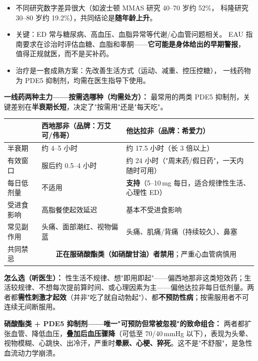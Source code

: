 \documentclass[12pt,UTF8,openany]{ctexbook}
\begin{document}
\begin{itemize}[leftmargin=2em]
  \item 不同研究数字差异很大（如波士顿 MMAS 研究 40--70 岁约 52\%，
        科隆研究 30--80 岁约 19.2\%），共同结论是\textbf{随年龄上升}。
  \item 关键：ED 常与糖尿病、高血压、血脂异常等代谢/心血管问题相关。
        EAU 指南要求在诊治时评估血糖、血脂和睾酮——\textbf{它可能是身体给出的早期警报}，
        值得正规就医，而不是买补药。
  \item 治疗是一套成熟方案：先改善生活方式（运动、减重、控压控糖），
        一线药物为 PDE5 抑制剂，均需在医生指导下使用。
\end{itemize}

\textbf{一线药两种主力——按需选哪种（均需处方）：} 最常用的两类 PDE5 抑制剂，关键差别在\textbf{半衰期长短}，决定了"按需用"还是"每天吃"。

\begin{tabularx}{\textwidth}{l X X}
\toprule
& 西地那非（品牌：万艾可/伟哥） & 他达拉非（品牌：希爱力） \\
\midrule
半衰期 & 约 4--5 小时 & 约 17.5 小时（长 3 倍以上） \\
有效窗口 & 服后约 0.5--4 小时 & 约 24 小时（"周末药/假日药"，一天内随时可用） \\
每日低剂量 & 不适用 & \textbf{支持}（5--10\,mg 每日，适合规律性生活、心理性 ED） \\
受进食影响 & 高脂餐使起效延迟 & 基本不受进食影响 \\
常见副作用 & 头痛、面部潮红、视物偏蓝 & 头痛、肌痛/背痛（持续较久）、鼻塞 \\
\midrule
共同禁忌 & \multicolumn{2}{c}{\textbf{正在服硝酸酯类（如硝酸甘油）者禁用}；严重心血管病慎用} \\
\bottomrule
\end{tabularx}

\textbf{怎么选（听医生）：} 性生活不规律、想"即用即起"——偏西地那非这类短效药；生活较规律、不想每次提前算时间、或心理因素为主——偏他达拉非每日低剂量。两者都\textbf{需性刺激才起效}（并非"吃了就自动勃起"）、都\textbf{不预防性病}；按需服用者不可连续无间断服用。

\textbf{硝酸酯类 + PDE5 抑制剂——唯一"可预防但常被忽视"的致命组合：} 两者都扩张血管、降低血压，\textbf{叠加后血压骤降}（可低至 70/40\,mmHg 以下），表现为头晕、视物模糊、心跳快、出冷汗，严重时\textbf{晕厥、心梗、猝死}。这不是"不舒服"，是急性血流动力学崩溃。
\end{document}
